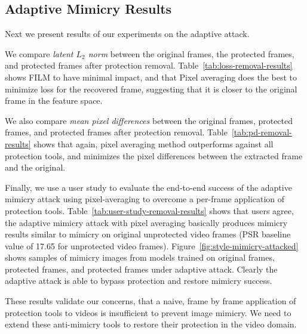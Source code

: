 \begin{table}[t]
  \centering
    \caption{Mean Pixel Difference between original frames, protected frames,
    protected frames after perturbation removal.}
\label{tab:pd-removal-results}
\vspace{-0.2in}
\end{table}


\subsection{Adaptive Mimicry Results}

Next we present results of our experiments on the adaptive attack.

 We compare
{\em latent $L_2$ norm} 
between the original frames, the protected frames, and protected frames after
protection removal.  Table~\ref{tab:loss-removal-results} shows FILM to
have minimal impact, and that Pixel averaging does the best to minimize loss
for the recovered frame, suggesting that it is closer to the original frame
in the feature space.

We also compare {\em mean pixel differences} between the original
frames, protected frames, and protected frames after protection removal.
Table~\ref{tab:pd-removal-results} shows that again, pixel averaging method
outperforms against all protection tools, and minimizes the pixel differences
between the extracted frame and the original. 

  Finally, we use a user
study to evaluate the end-to-end success of the adaptive mimicry attack using
pixel-averaging to overcome a per-frame application of protection tools.
Table~\ref{tab:user-study-removal-results} shows that users agree, the
adaptive mimicry attack with pixel averaging basically produces mimicry
results similar to mimicry on original unprotected video frames (PSR baseline
value of 17.65 for unprotected video frames).
Figure~\ref{fig:style-mimicry-attacked} shows samples of mimicry images from
models trained on original frames, protected frames, and protected frames
under adaptive attack. Clearly the adaptive attack is able to bypass
protection and restore mimicry success.

These results validate our concerns, that a naive, frame by frame application
of protection tools to videos is insufficient to prevent image mimicry. We
need to extend these anti-mimicry tools to restore their protection in the
video domain.